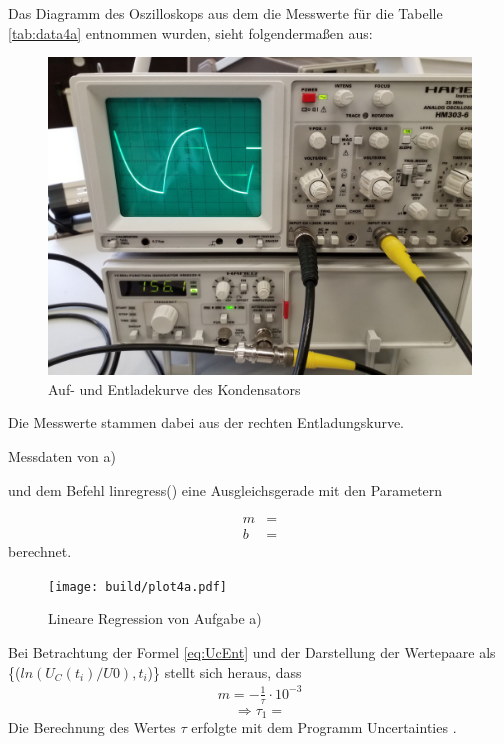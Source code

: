   Das Diagramm des Oszilloskops aus dem die Messwerte für die Tabelle \ref{tab:data4a} entnommen 
  wurden, sieht folgendermaßen aus:
  \begin{figure}[H]
    \includegraphics[width=\textwidth]{images/4a.jpg}
    \centering
    \caption{Auf- und Entladekurve des Kondensators}
    \label{fig:4ajpg}
  \end{figure}
  Die Messwerte stammen dabei aus der rechten Entladungskurve.
  \begin{table}[H]
        \centering
        \caption{Messdaten von a)}
         
        \label{tab:data4a}
  \end{table}

   \cite{scipy} und dem Befehl linregress() eine
  Ausgleichsgerade mit den Parametern

  \begin{align*}
    m &= \text{}\\
    b &= \text{}
  \end{align*}
  berechnet.
  
  \begin{figure}[H]
    \texttt{[image: build/plot4a.pdf]}
    \centering
    \caption{Lineare Regression von Aufgabe a)}
    \label{fig:4a}
  \end{figure}
  Bei Betrachtung der Formel \eqref{eq:UcEnt} und der Darstellung der Wertepaare als 
  \{($ln(U_C(t_i)/U0),t_i$)\} stellt sich heraus, dass
  \begin{align*}
    m = -\frac{1}{\tau} \cdot 10^{-3}
  \end{align*}
  \begin{equation}
   \Rightarrow \tau_1 = \text{}
  \end{equation}
  Die Berechnung des Wertes $\tau$ erfolgte mit dem Programm Uncertainties \cite{uncertainties}.



